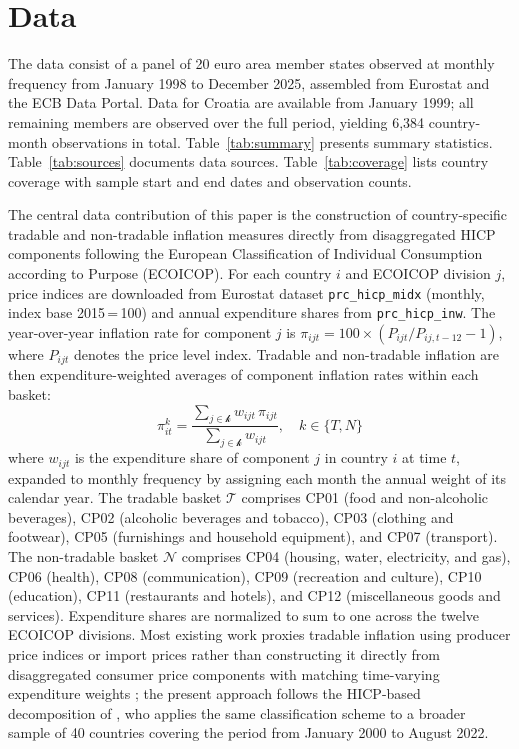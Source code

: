 \section{Data}\label{sec:data}

The data consist of a panel of 20 euro area member states observed at monthly frequency from
January 1998 to December 2025, assembled from Eurostat and the ECB Data Portal.
Data for Croatia are available from January 1999; all remaining members are observed over
the full period, yielding 6,384 country-month observations in total.
Table~\ref{tab:summary} presents summary statistics.
Table~\ref{tab:sources} documents data sources.
Table~\ref{tab:coverage} lists country coverage with sample start and end dates and
observation counts.

The central data contribution of this paper is the construction of country-specific tradable and
non-tradable inflation measures directly from disaggregated HICP components following the
European Classification of Individual Consumption according to Purpose (ECOICOP).
For each country $i$ and ECOICOP division $j$, price indices are downloaded from Eurostat
dataset \texttt{prc\_hicp\_midx} (monthly, index base 2015\,=\,100) and annual expenditure
shares from \texttt{prc\_hicp\_inw}.
The year-over-year inflation rate for component $j$ is
$\pi_{ijt} = 100\times(P_{ijt}/P_{ij,t-12}-1)$,
where $P_{ijt}$ denotes the price level index.
Tradable and non-tradable inflation are then expenditure-weighted averages of component
inflation rates within each basket:
\begin{equation}
    \pi^k_{it} = \frac{\sum_{j \in \mathcal{k}} w_{ijt} \, \pi_{ijt}}{\sum_{j \in \mathcal{k}} w_{ijt}},
    \quad k \in \{T, N\}
    \label{eq:basket}
\end{equation}
where $w_{ijt}$ is the expenditure share of component $j$ in country $i$ at time $t$, expanded
to monthly frequency by assigning each month the annual weight of its calendar year.
The tradable basket $\mathcal{T}$ comprises CP01 (food and non-alcoholic beverages), CP02
(alcoholic beverages and tobacco), CP03 (clothing and footwear), CP05 (furnishings and
household equipment), and CP07 (transport).
The non-tradable basket $\mathcal{N}$ comprises CP04 (housing, water, electricity, and gas),
CP06 (health), CP08 (communication), CP09 (recreation and culture), CP10 (education),
CP11 (restaurants and hotels), and CP12 (miscellaneous goods and services).
Expenditure shares are normalized to sum to one across the twelve ECOICOP divisions.
Most existing work proxies tradable inflation using producer price indices or import prices
rather than constructing it directly from disaggregated consumer price components with
matching time-varying expenditure weights \citep{ha2023}; the present approach follows the
HICP-based decomposition of \citet{andriantomanga2025}, who applies the same
classification scheme to a broader sample of 40 countries covering the period from January
2000 to August 2022.

